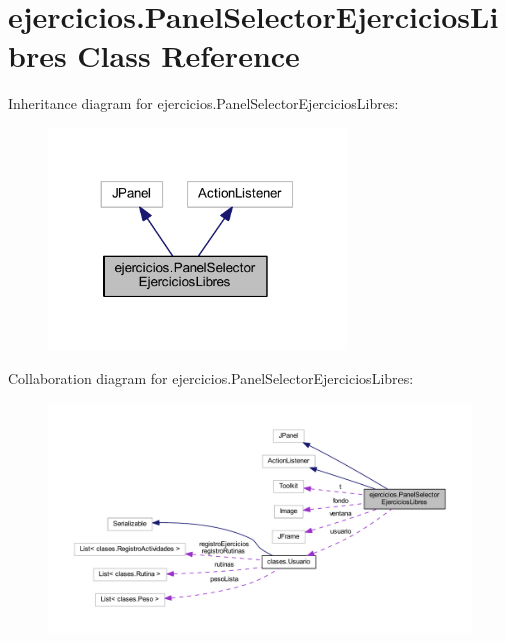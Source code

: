 \hypertarget{classejercicios_1_1_panel_selector_ejercicios_libres}{}\section{ejercicios.\+Panel\+Selector\+Ejercicios\+Libres Class Reference}
\label{classejercicios_1_1_panel_selector_ejercicios_libres}


Inheritance diagram for ejercicios.\+Panel\+Selector\+Ejercicios\+Libres\+:
\nopagebreak
\begin{figure}[H]
\begin{center}
\leavevmode
\includegraphics[width=224pt]{classejercicios_1_1_panel_selector_ejercicios_libres__inherit__graph}
\end{center}
\end{figure}


Collaboration diagram for ejercicios.\+Panel\+Selector\+Ejercicios\+Libres\+:
\nopagebreak
\begin{figure}[H]
\begin{center}
\leavevmode
\includegraphics[width=350pt]{classejercicios_1_1_panel_selector_ejercicios_libres__coll__graph}
\end{center}
\end{figure}
